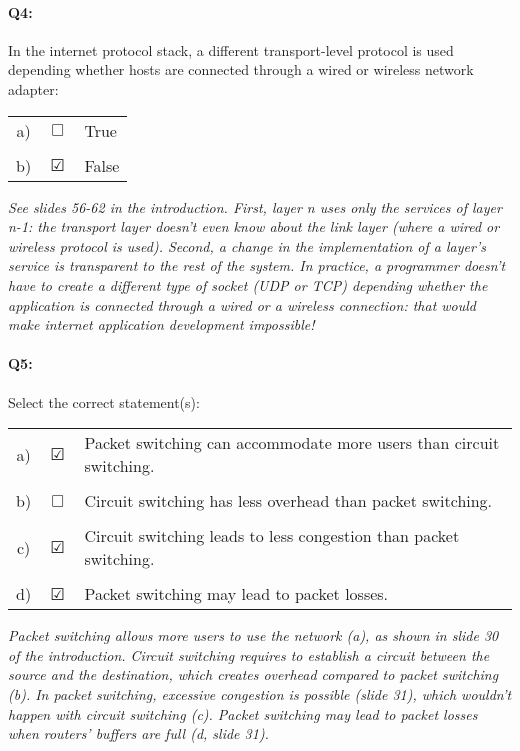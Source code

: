 \documentclass{llncs}
\newcommand{\answer}[1]{{\color{red}\textit{#1}\color{black}}}
\begin{document}
\paragraph{\textbf{Q4:}} 
In the internet protocol stack, a different transport-level protocol is used depending whether hosts
are connected through a wired or wireless network adapter:

\begin{tabular}{ccl}
  a) & $\Box$ & True\\
  \\
  b) & $\CheckedBox$ & False
\end{tabular}

\answer{See slides 56-62 in the introduction. First, layer n uses only
  the services of layer n-1: the transport layer doesn't even know
  about the link layer (where a wired or wireless protocol is
  used). Second, a change in the implementation of a layer's service
  is transparent to the rest of the system. In practice, a programmer
  doesn't have to create a different type of socket (UDP or TCP)
  depending whether the application is connected through a wired or a
  wireless connection: that would make internet application
  development impossible!}

\paragraph{\textbf{Q5:}}
Select the correct statement(s):

\begin{tabular}{ccl}
  a) & $\CheckedBox$ & Packet switching can accommodate more users than circuit switching.\\
  \\
  b) & $\Box$ & Circuit switching has less overhead than packet switching.\\
  \\
  c) & $\CheckedBox$ & Circuit switching leads to less congestion than packet switching.\\
  \\
  d) & $\CheckedBox$ & Packet switching may lead to packet losses.\\
\end{tabular}

\answer{Packet switching allows more users to use the network (a), as
  shown in slide 30 of the introduction. Circuit switching requires to establish a circuit between the source and the destination, which creates overhead compared to packet switching (b). In packet switching, excessive congestion is possible (slide 31), which wouldn't happen with circuit switching (c). Packet switching may lead to packet losses when routers' buffers are full (d, slide 31).}
\end{document}
